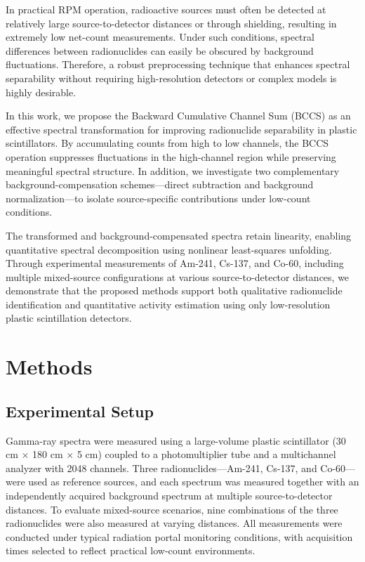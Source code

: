 \documentclass[10pt]{wlscirep}
\begin{document}
In practical RPM operation, radioactive sources must often be detected at relatively large source-to-detector distances or through shielding, resulting in extremely low net-count measurements. Under such conditions, spectral differences between radionuclides can easily be obscured by background fluctuations. Therefore, a robust preprocessing technique that enhances spectral separability without requiring high-resolution detectors or complex models is highly desirable.

In this work, we propose the Backward Cumulative Channel Sum (BCCS) as an effective spectral transformation for improving radionuclide separability in plastic scintillators. By accumulating counts from high to low channels, the BCCS operation suppresses fluctuations in the high-channel region while preserving meaningful spectral structure. In addition, we investigate two complementary background-compensation schemes—direct subtraction and background normalization—to isolate source-specific contributions under low-count conditions.

The transformed and background-compensated spectra retain linearity, enabling quantitative spectral decomposition using nonlinear least-squares unfolding. Through experimental measurements of Am-241, Cs-137, and Co-60, including multiple mixed-source configurations at various source-to-detector distances, we demonstrate that the proposed methods support both qualitative radionuclide identification and quantitative activity estimation using only low-resolution plastic scintillation detectors.

\section*{Methods}
\subsection*{Experimental Setup}
Gamma-ray spectra were measured using a large-volume plastic scintillator (30 cm $\times$ 180 cm $\times$ 5 cm) coupled to a photomultiplier tube and a multichannel analyzer with 2048 channels. Three radionuclides—Am-241, Cs-137, and Co-60—were used as reference sources, and each spectrum was measured together with an independently acquired background spectrum at multiple source-to-detector distances. To evaluate mixed-source scenarios, nine combinations of the three radionuclides were also measured at varying distances. All measurements were conducted under typical radiation portal monitoring conditions, with acquisition times selected to reflect practical low-count environments.
\end{document}
